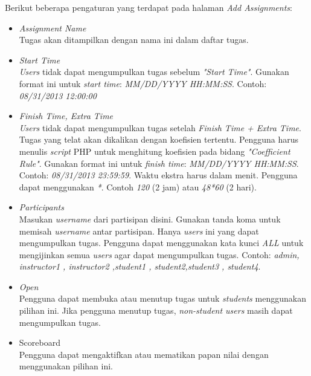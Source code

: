 Berikut beberapa pengaturan yang terdapat pada halaman \textit{Add Assignments}:
\begin{itemize}
	\item \textit{Assignment Name} \\
	Tugas akan ditampilkan dengan nama ini dalam daftar tugas.
	
	\item \textit{Start Time} \\
	\textit{Users} tidak dapat mengumpulkan tugas sebelum \textit{"Start Time"}. Gunakan format ini untuk \textit{start time}: \textit{MM/DD/YYYY HH:MM:SS}. Contoh: \textit{08/31/2013 12:00:00}
	
	\item \textit{Finish Time, Extra Time}\\
	\textit{Users} tidak dapat mengumpulkan tugas setelah \textit{Finish Time + Extra Time}. Tugas yang telat akan dikalikan dengan koefisien tertentu. Pengguna harus menulis \textit{script} PHP untuk menghitung koefisien pada bidang \textit{"Coefficient Rule"}. Gunakan format ini untuk \textit{finish time}: \textit{MM/DD/YYYY HH:MM:SS}. Contoh: \textit{08/31/2013 23:59:59}. Waktu ekstra harus dalam menit. Pengguna dapat menggunakan \textit{*}. Contoh \textit{120} (2 jam) atau \textit{48*60} (2 hari).
	
	\item \textit{Participants} \\
	Masukan \textit{username} dari partisipan disini. Gunakan tanda koma untuk memisah \textit{username} antar partisipan. Hanya \textit{users} ini yang dapat mengumpulkan tugas. Pengguna dapat menggunakan kata kunci \textit{ALL} untuk mengijinkan semua \textit{users} agar dapat mengumpulkan tugas. Contoh: \textit{admin, instructor1 , instructor2 ,student1  ,   student2,student3 , student4}.
	
	\item \textit{Open} \\
	Pengguna dapat membuka atau menutup tugas untuk \textit{students} menggunakan pilihan ini. Jika pengguna menutup tugas, \textit{non-student users} masih dapat mengumpulkan tugas.
	
	\item Scoreboard \\
	Pengguna dapat mengaktifkan atau mematikan papan nilai dengan menggunakan pilihan ini.
	

\end{itemize}
